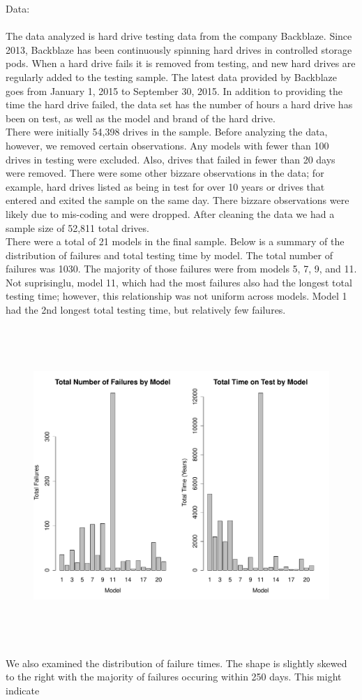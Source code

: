 \documentclass{article}
\begin{document}
Data:\\\\
The data analyzed is hard drive testing data from the company Backblaze.  Since 2013, Backblaze has been continuously spinning hard drives in controlled storage pods.  When a hard drive fails it is removed from testing, and new hard drives are regularly added to the testing sample.  The latest data provided by Backblaze goes from January 1, 2015 to September 30, 2015.  In addition to providing the time the hard drive failed, the data set has the number of hours a hard drive has been on test, as well as the model and brand of the hard drive.\\
There were initially 54,398 drives in the sample.  Before analyzing the data, however, we removed certain observations.  Any models with fewer than 100 drives in testing were excluded.  Also, drives that failed in fewer than 20 days were removed.  There were some other bizzare observations in the data; for example, hard drives listed as being in test for over 10 years or drives that entered and exited the sample on the same day.  There bizzare observations were likely due to mis-coding and were dropped. After cleaning the data we had a sample size of 52,811 total drives.\\

There were a total of 21 models in the final sample.  Below is a summary of the distribution of failures and total testing time by model.  The total number of failures was 1030.  The majority of those failures were from models 5, 7, 9, and 11.  Not suprisinglu, model 11, which had the most failures also had the longest total testing time; however, this relationship was not uniform across models.  Model 1 had the 2nd longest total testing time, but relatively few failures.
\begin{figure}[H]
\centering
\includegraphics[height=12cm]{sumstat1.pdf}
\end{figure}
We also examined the distribution of failure times.  The shape is slightly skewed to the right with the majority of failures occuring within 250 days.  This might indicate 
\end{document}
